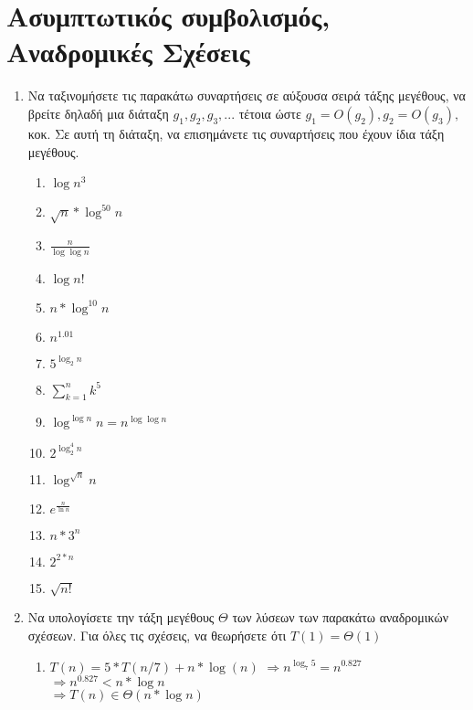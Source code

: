 




\section{Ασυμπτωτικός συμβολισμός, Αναδρομικές Σχέσεις} \setcounter{section}{1}
\begin{enumerate}
    \item 
        \begin{textit}
            Να ταξινομήσετε τις παρακάτω συναρτήσεις σε αύξουσα σειρά τάξης
            μεγέθους, να βρείτε δηλαδή μια διάταξη $g_1,g_2,g_3,...$ τέτοια
            ώστε $g_1 = O(g_2),g_2=O(g_3),$ κοκ. Σε αυτή τη διάταξη, να
            επισημάνετε τις συναρτήσεις που έχουν ίδια τάξη μεγέθους.
        \end{textit}
        \begin{enumerate}
            \item $\log {n^3}$
            \item $\sqrt{n}*\log^{50}{n} $
            \item $\frac{n}{\log{\log{n}} } $
            \item $\log{n!} $
            \item $n*\log^{10}{n} $
            \item $n^{1.01} $
            \item $5^{\log_{2}{n}} $
            \item $\sum_{k=1}^n{k^5} $
            \item $\log^{\log{n}}{n} = n^{\log{\log{n}} } $
            \item $2^{\log_2^4{n}} $
            \item $\log^{\sqrt{n}}{n} $
            \item $e^{\frac{n}{\ln{n}} } $
            \item $n*3^n $
            \item $2^{2*n} $
            \item $\sqrt{n!} $
        \end{enumerate}

    \item 
        \begin{textit}
            Να υπολογίσετε την τάξη μεγέθους $\Theta$ των λύσεων των παρακάτω αναδρομικών
            σχέσεων. Για όλες τις σχέσεις, να θεωρήσετε ότι $T(1)=\Theta(1)$
        \end{textit}
        \begin{enumerate}
            \item $T(n)=5*T(n/7)+n*\log(n)$
                $\Rightarrow n^{\log _7 {5}} = n^{0.827}$
                $\Rightarrow n^{0.827} < n*\log{n}$\\
                $\Rightarrow T(n) \in \Theta(n*\log{n})$


\end{enumerate}
\end{enumerate}
